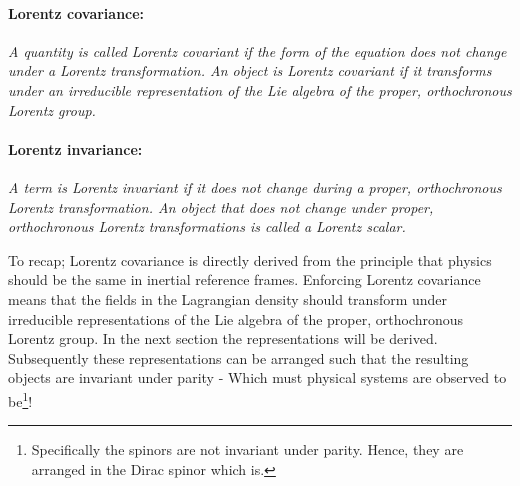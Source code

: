 \paragraph{Lorentz covariance:} \emph{A quantity is called Lorentz covariant if the form of the equation does not change under a Lorentz  transformation. An object is Lorentz covariant if it transforms under an irreducible representation of the Lie algebra of the proper, orthochronous Lorentz group.} 

\paragraph{Lorentz invariance:} \emph{A term is Lorentz invariant if it does not change during a proper, orthochronous Lorentz transformation. An object that does not change under proper, orthochronous Lorentz transformations is called a Lorentz scalar.}\newline

To recap; Lorentz covariance is directly derived from the principle that physics should be the same in inertial reference frames. Enforcing Lorentz covariance means that the fields in the Lagrangian density should transform under irreducible representations of the Lie algebra of the proper, orthochronous Lorentz group. In the next section the representations will be derived. Subsequently these representations can be arranged such that the resulting objects are invariant under parity - Which must physical systems are observed to be\footnote{Specifically the spinors are not invariant under parity. Hence, they are arranged in the Dirac spinor which is.}! 

